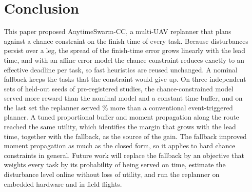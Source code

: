 \section{Conclusion}\label{sec:conclusion}
This paper proposed AnytimeSwarm-CC, a multi-UAV replanner that plans against a chance constraint on the finish time of
every task. Because disturbances persist over a leg, the spread of the finish-time error grows linearly with the lead
time, and with an affine error model the chance constraint reduces exactly to an effective deadline per task, so fast
heuristics are reused unchanged. A nominal fallback keeps the tasks that the constraint would give up. On three
independent sets of held-out seeds of pre-registered studies, the chance-constrained model served more reward than the
nominal model and a constant time buffer, and on the last set the replanner served \% more than a
conventional event-triggered planner. A tuned proportional buffer and moment propagation along the route reached the
same utility, which identifies the margin that grows with the lead time, together with the fallback, as the source of
the gain. The fallback improved moment propagation as much as the closed form, so it applies to hard chance constraints
in general. %
Future work will replace the fallback by an objective that weights every task by its probability of being served on
time, estimate the disturbance level online without loss of utility, and run the replanner on embedded hardware and in
field flights.
